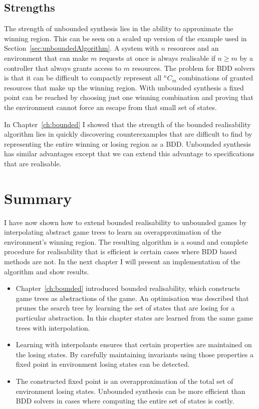 \subsection{Strengths}

The strength of unbounded synthesis lies in the ability to approximate the winning region. This can be seen on a scaled up version of the example used in Section~\ref{sec:unboundedAlgorithm}. A system with $n$ resources and an environment that can make $m$ requests at once is always realisable if $n \geq m$ by a controller that always grants access to $m$ resources. The problem for BDD solvers is that it can be difficult to compactly represent all $^n C_m$ combinations of granted resources that make up the winning region. With unbounded synthesis a fixed point can be reached by choosing just one winning combination and proving that the environment cannot force an escape from that small set of states.

In Chapter~\ref{ch:bounded} I showed that the strength of the bounded realisability algorithm lies in quickly discovering counterexamples that are difficult to find by representing the entire winning or losing region as a BDD. Unbounded synthesis has similar advantages except that we can extend this advantage to specifications that are realisable.

\section{Summary}

I have now shown how to extend bounded realisability to unbounded games by interpolating abstract game trees to learn an overapproximation of the environment's winning region. The resulting algorithm is a sound and complete procedure for realisability that is efficient is certain cases where BDD based methods are not. In the next chapter I will present an implementation of the algorithm and show results.

\begin{itemize}
    \item Chapter~\ref{ch:bounded} introduced bounded realisability, which constructs game trees as abstractions of the game. An optimisation was described that prunes the search tree by learning the set of states that are losing for a particular abstraction. In this chapter states are learned from the same game trees with interpolation.
    \item Learning with interpolants ensures that certain properties are maintained on the losing states. By carefully maintaining invariants using those properties a fixed point in environment losing states can be detected.
    \item The constructed fixed point is an overapproximation of the total set of environment losing states. Unbounded synthesis can be more efficient than BDD solvers in cases where computing the entire set of states is costly.
\end{itemize}
